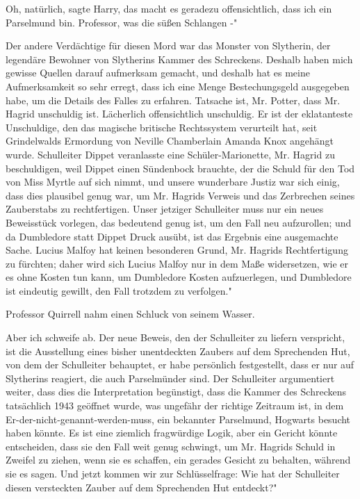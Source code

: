 \glqq{}Oh, natürlich\grqq{}, sagte Harry, \glqq{}das macht es geradezu
offensichtlich, dass ich ein Parselmund bin. Professor, was die süßen Schlangen
-"

\glqq{}Der andere Verdächtige für diesen Mord war das Monster von Slytherin, der
legendäre Bewohner von Slytherins Kammer des Schreckens. Deshalb haben mich
gewisse Quellen darauf aufmerksam gemacht, und deshalb hat es meine
Aufmerksamkeit so sehr erregt, dass ich eine Menge Bestechungsgeld ausgegeben
habe, um die Details des Falles zu erfahren. Tatsache ist, Mr. Potter, dass Mr.
Hagrid unschuldig ist. Lächerlich offensichtlich unschuldig. Er ist der
eklatanteste Unschuldige, den das magische britische Rechtssystem verurteilt
hat, seit Grindelwalds Ermordung von Neville Chamberlain Amanda Knox angehängt
wurde. Schulleiter Dippet veranlasste eine Schüler-Marionette, Mr. Hagrid zu
beschuldigen, weil Dippet einen Sündenbock brauchte, der die Schuld für den Tod
von Miss Myrtle auf sich nimmt, und unsere wunderbare Justiz war sich einig,
dass dies plausibel genug war, um Mr. Hagrids Verweis und das Zerbrechen seines
Zauberstabs zu rechtfertigen. Unser jetziger Schulleiter muss nur ein neues
Beweisstück vorlegen, das bedeutend genug ist, um den Fall neu aufzurollen; und
da Dumbledore statt Dippet Druck ausübt, ist das Ergebnis eine ausgemachte
Sache. Lucius Malfoy hat keinen besonderen Grund, Mr. Hagrids Rechtfertigung zu
fürchten; daher wird sich Lucius Malfoy nur in dem Maße widersetzen, wie er es
ohne Kosten tun kann, um Dumbledore Kosten aufzuerlegen, und Dumbledore ist
eindeutig gewillt, den Fall trotzdem zu verfolgen."

Professor Quirrell nahm einen Schluck von seinem Wasser.

\glqq{}Aber ich schweife ab. Der neue Beweis, den der Schulleiter zu liefern
verspricht, ist die Ausstellung eines bisher unentdeckten Zaubers auf dem
Sprechenden Hut, von dem der Schulleiter behauptet, er habe persönlich
festgestellt, dass er nur auf Slytherins reagiert, die auch Parselmünder sind.
Der Schulleiter argumentiert weiter, dass dies die Interpretation begünstigt,
dass die Kammer des Schreckens tatsächlich 1943 geöffnet wurde, was ungefähr der
richtige Zeitraum ist, in dem Er-der-nicht-genannt-werden-muss, ein bekannter
Parselmund, Hogwarts besucht haben könnte. Es ist eine ziemlich fragwürdige
Logik, aber ein Gericht könnte entscheiden, dass sie den Fall weit genug
schwingt, um Mr. Hagrids Schuld in Zweifel zu ziehen, wenn sie es schaffen, ein
gerades Gesicht zu behalten, während sie es sagen. Und jetzt kommen wir zur
Schlüsselfrage: Wie hat der Schulleiter diesen versteckten Zauber auf dem
Sprechenden Hut entdeckt?"

